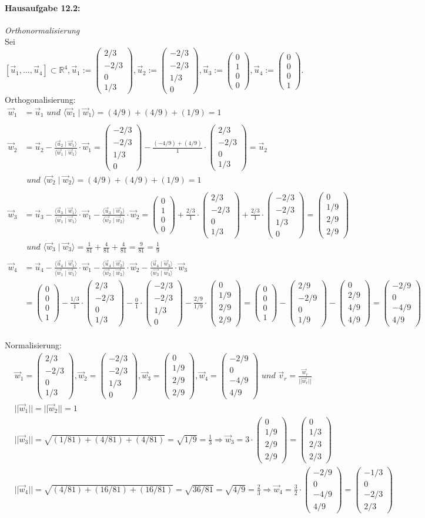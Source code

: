 \documentclass[titlepage]{article}
\newcommand{\R}{\mathbb{R}}
\newcommand{\1}{\mathbb{1}}
\newcommand{\0}{\mathbb{0}}
\newcommand{\vecV}[4]{\left(\begin{smallmatrix}#1\\#2\\#3\\#4\end{smallmatrix}\right)}
\newcommand{\skalarProdukt}[2]{\langle#1\mid#2\rangle}
\begin{document}
	\paragraph{Hausaufgabe 12.2:} \textit{Orthonormalisierung} \\ Sei $[\vec{u}_1,\dots,\vec{u}_4]\subset\R^4,\vec{u}_1:=\vecV{2/3}{-2/3}{0}{1/3},\vec{u}_2:=\vecV{-2/3}{-2/3}{1/3}{0},\vec{u}_3:=\vecV{0}{1}{0}{0},\vec{u}_4:=\vecV{0}{0}{0}{1}.$
	\\ Orthogonalisierung:
	\begin{align*}
		\vec{w}_1&=\vec{u}_1\textit{ und }\skalarProdukt{\vec{w}_1}{\vec{w}_1}=(4/9)+(4/9)+(1/9)=1
		\\\\
		\vec{w}_2&=\vec{u}_2-\frac{\skalarProdukt{\vec{u}_2}{\vec{w}_1}}{\skalarProdukt{\vec{w}_1}{\vec{w}_1}}\cdot\vec{w}_1
		=\vecV{-2/3}{-2/3}{1/3}{0}-\frac{(-4/9)+(4/9)}{1}\cdot\vecV{2/3}{-2/3}{0}{1/3}=\vec{u}_2\\
		&\textit{ und }\skalarProdukt{\vec{w}_2}{\vec{w}_2}=(4/9)+(4/9)+(1/9)=1
		\\\\
		\vec{w}_3&=\vec{u}_3-\frac{\skalarProdukt{\vec{u}_3}{\vec{w}_1}}{\skalarProdukt{\vec{w}_1}{\vec{w}_1}}\cdot\vec{w}_1-\frac{\skalarProdukt{\vec{u}_3}{\vec{w}_2}}{\skalarProdukt{\vec{w}_2}{\vec{w}_2}}\cdot\vec{w}_2
		=\vecV{0}{1}{0}{0}+\frac{2/3}{1}\cdot\vecV{2/3}{-2/3}{0}{1/3}+\frac{2/3}{1}\cdot\vecV{-2/3}{-2/3}{1/3}{0}=\vecV{0}{1/9}{2/9}{2/9}\\
		&\textit{ und }\skalarProdukt{\vec{w}_3}{\vec{w}_3}=\frac{1}{81}+\frac{4}{81}+\frac{4}{81}=\frac{9}{81}=\frac{1}{9}
		\\\\
		\vec{w}_4&=\vec{u}_4-\frac{\skalarProdukt{\vec{u}_4}{\vec{w}_1}}{\skalarProdukt{\vec{w}_1}{\vec{w}_1}}\cdot\vec{w}_1-\frac{\skalarProdukt{\vec{u}_4}{\vec{w}_2}}{\skalarProdukt{\vec{w}_2}{\vec{w}_2}}\cdot\vec{w}_2-\frac{\skalarProdukt{\vec{u}_4}{\vec{w}_3}}{\skalarProdukt{\vec{w_3}}{\vec{w}_3}}\cdot\vec{w}_3
		\\
		&=\vecV{0}{0}{0}{1}-\frac{1/3}{1}\cdot\vecV{2/3}{-2/3}{0}{1/3}-\frac{0}{1}\cdot\vecV{-2/3}{-2/3}{1/3}{0}-\frac{2/9}{1/9}\cdot\vecV{0}{1/9}{2/9}{2/9}=\vecV{0}{0}{0}{1}-\vecV{2/9}{-2/9}{0}{1/9}-\vecV{0}{2/9}{4/9}{4/9}=\vecV{-2/9}{0}{-4/9}{4/9}
	\end{align*}
	\\ Normalisierung:
	\begin{align*}
		&\vec{w}_1=\vecV{2/3}{-2/3}{0}{1/3},\vec{w}_2=\vecV{-2/3}{-2/3}{1/3}{0},\vec{w}_3=\vecV{0}{1/9}{2/9}{2/9},\vec{w}_4=\vecV{-2/9}{0}{-4/9}{4/9}\textit{ und }\vec{v}_r=\frac{\vec{w}_r}{||\vec{w}_r||}\\
		&||\vec{w}_1||=||\vec{w}_2||=1\\
		&||\vec{w}_3||=\sqrt{(1/81)+(4/81)+(4/81)}=\sqrt{1/9}=\frac{1}{3}\Rightarrow\vec{w}_3=3\cdot\vecV{0}{1/9}{2/9}{2/9}=\vecV{0}{1/3}{2/3}{2/3}\\
		&||\vec{w}_4||=\sqrt{(4/81)+(16/81)+(16/81)}=\sqrt{36/81}=\sqrt{4/9}=\frac{2}{3}\Rightarrow\vec{w}_4=\frac{3}{2}\cdot\vecV{-2/9}{0}{-4/9}{4/9}=\vecV{-1/3}{0}{-2/3}{2/3}
	\end{align*}
\end{document}
